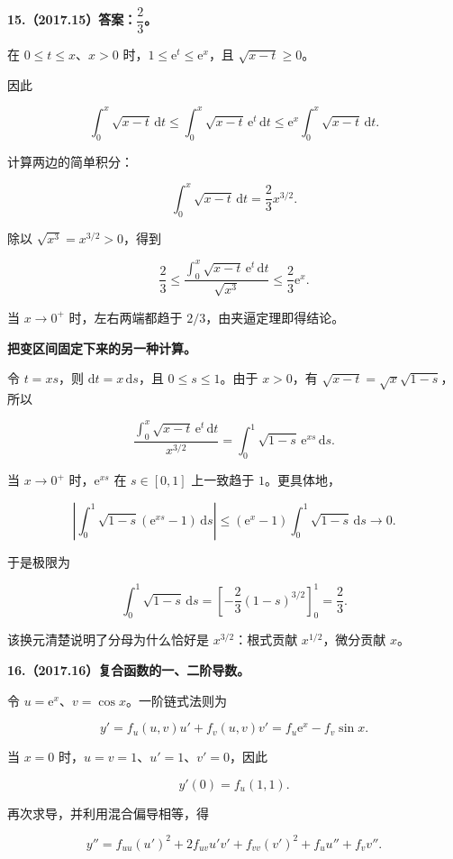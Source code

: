 \documentclass[UTF8,11pt,fontset=windows]{ctexart}
\begin{document}
\textbf{15.（2017.15）答案：$\dfrac23$。}

在 $0\le t\le x$、$x>0$ 时，$1\le\mathrm e^t\le\mathrm e^x$，且 $\sqrt{x-t}\ge0$。

因此

$$
\int_0^x\sqrt{x-t}\,\mathrm dt
\le\int_0^x\sqrt{x-t}\,\mathrm e^t\,\mathrm dt
\le\mathrm e^x\int_0^x\sqrt{x-t}\,\mathrm dt.
$$

计算两边的简单积分：

$$
\int_0^x\sqrt{x-t}\,\mathrm dt=\frac23x^{3/2}.
$$

除以 $\sqrt{x^3}=x^{3/2}>0$，得到

$$
\frac23\le
\frac{\int_0^x\sqrt{x-t}\,\mathrm e^t\,\mathrm dt}{\sqrt{x^3}}
\le\frac23\mathrm e^x.
$$

当 $x\to0^+$ 时，左右两端都趋于 $2/3$，由夹逼定理即得结论。

\textbf{把变区间固定下来的另一种计算。}

令 $t=xs$，则 $\mathrm dt=x\,\mathrm ds$，且 $0\le s\le1$。由于 $x>0$，有 $\sqrt{x-t}=\sqrt x\sqrt{1-s}$，所以

$$
\frac{\int_0^x\sqrt{x-t}\,\mathrm e^t\,\mathrm dt}{x^{3/2}}
=\int_0^1\sqrt{1-s}\,\mathrm e^{xs}\,\mathrm ds.
$$

当 $x\to0^+$ 时，$\mathrm e^{xs}$ 在 $s\in[0,1]$ 上一致趋于 $1$。更具体地，

$$
\left|\int_0^1\sqrt{1-s}(\mathrm e^{xs}-1)\,\mathrm ds\right|
\le(\mathrm e^x-1)\int_0^1\sqrt{1-s}\,\mathrm ds\longrightarrow0.
$$

于是极限为

$$
\int_0^1\sqrt{1-s}\,\mathrm ds
=\left[-\frac23(1-s)^{3/2}\right]_0^1=\frac23.
$$

该换元清楚说明了分母为什么恰好是 $x^{3/2}$：根式贡献 $x^{1/2}$，微分贡献 $x$。

\clearpage

\textbf{16.（2017.16）复合函数的一、二阶导数。}

令 $u=\mathrm e^x$、$v=\cos x$。一阶链式法则为

$$
y'=f_u(u,v)u'+f_v(u,v)v'
=f_u\mathrm e^x-f_v\sin x.
$$

当 $x=0$ 时，$u=v=1$、$u'=1$、$v'=0$，因此

$$
y'(0)=f_u(1,1).
$$

再次求导，并利用混合偏导相等，得

$$
y''=f_{uu}(u')^2+2f_{uv}u'v'+f_{vv}(v')^2+f_u u''+f_v v''.
$$
\end{document}
